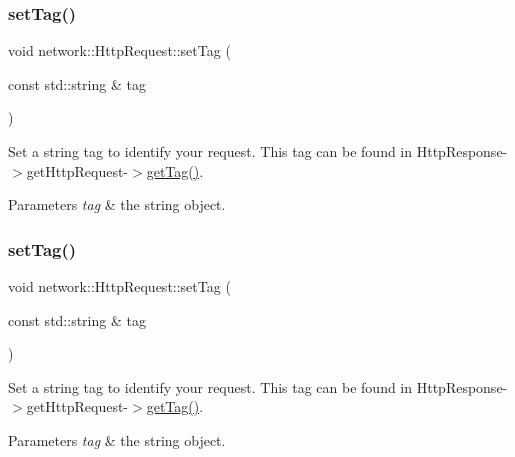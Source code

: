 \subsubsection{\texorpdfstring{set\+Tag()}{setTag()}\hspace{0.1cm}{\footnotesize\ttfamily [1/2]}}
{\footnotesize\ttfamily void network\+::\+Http\+Request\+::set\+Tag (\begin{DoxyParamCaption}\item[{const std\+::string \&}]{tag }\end{DoxyParamCaption})\hspace{0.3cm}{\ttfamily [inline]}}

Set a string tag to identify your request. This tag can be found in Http\+Response-\/$>$get\+Http\+Request-\/$>$\hyperlink{classnetwork_1_1HttpRequest_a6f8026156353b462ecfa2884e0b83421}{get\+Tag()}.


\begin{DoxyParams}{Parameters}
{\em tag} & the string object. \\
\hline
\end{DoxyParams}
\mbox{\label{classnetwork_1_1HttpRequest_a0e4f8ff5b153e624857183be498ef33d}} 
\subsubsection{\texorpdfstring{set\+Tag()}{setTag()}\hspace{0.1cm}{\footnotesize\ttfamily [2/2]}}
{\footnotesize\ttfamily void network\+::\+Http\+Request\+::set\+Tag (\begin{DoxyParamCaption}\item[{const std\+::string \&}]{tag }\end{DoxyParamCaption})\hspace{0.3cm}{\ttfamily [inline]}}

Set a string tag to identify your request. This tag can be found in Http\+Response-\/$>$get\+Http\+Request-\/$>$\hyperlink{classnetwork_1_1HttpRequest_a6f8026156353b462ecfa2884e0b83421}{get\+Tag()}.


\begin{DoxyParams}{Parameters}
{\em tag} & the string object. \\
\hline
\end{DoxyParams}
\mbox{\label{classnetwork_1_1HttpRequest_a2f7663791f980b15c90c34acf281fe4a}} 
